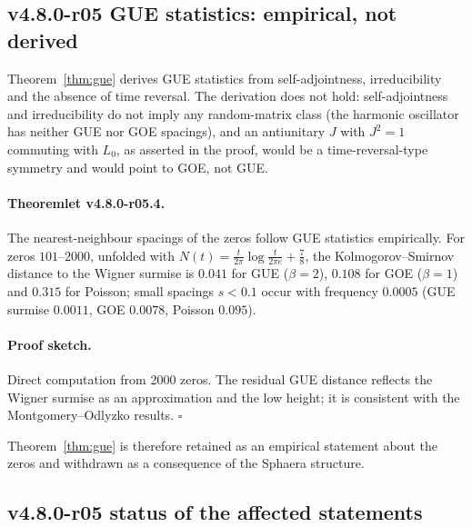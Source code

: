 \subsection*{v4.8.0-r05 GUE statistics: empirical, not derived}
\label{subsec:v480-r05-gue}

Theorem~\ref{thm:gue} derives GUE statistics from self-adjointness, irreducibility and the
absence of time reversal.  The derivation does not hold: self-adjointness and irreducibility do not
imply any random-matrix class (the harmonic oscillator has neither GUE nor GOE spacings), and an
antiunitary \(J\) with \(J^2=1\) commuting with \(L_0\), as asserted in the proof, would be a
time-reversal-type symmetry and would point to GOE, not GUE.

\paragraph{Theoremlet v4.8.0-r05.4.}
The nearest-neighbour spacings of the zeros follow GUE statistics empirically.  For zeros
\(101\)--\(2000\), unfolded with \(N(t)=\tfrac{t}{2\pi}\log\tfrac{t}{2\pi e}+\tfrac78\), the
Kolmogorov--Smirnov distance to the Wigner surmise is \(0.041\) for GUE (\(\beta=2\)), \(0.108\)
for GOE (\(\beta=1\)) and \(0.315\) for Poisson; small spacings \(s<0.1\) occur with frequency
\(0.0005\) (GUE surmise \(0.0011\), GOE \(0.0078\), Poisson \(0.095\)).

\paragraph{Proof sketch.}
Direct computation from 2000 zeros.  The residual GUE distance reflects the Wigner surmise as an
approximation and the low height; it is consistent with the Montgomery--Odlyzko results.
\(\square\)

Theorem~\ref{thm:gue} is therefore retained as an empirical statement about the zeros and
withdrawn as a consequence of the Sphaera structure.

\subsection*{v4.8.0-r05 status of the affected statements}
\label{subsec:v480-r05-status}

